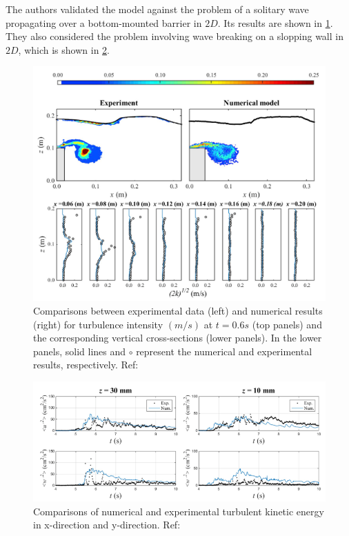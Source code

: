 The authors validated the model against the problem of a solitary wave propagating over a bottom-mounted barrier in $2D$. Its results are shown in \ref{fig:Wang2020-wave-propogation-result}. They also considered the problem involving wave breaking on a slopping wall in $2D$, which is shown in \ref{fig:Wang2020-wave-breaking-result}.
\begin{figure}[h!]
	\centering
	\includegraphics[scale=0.75]{Figures/research_papers/Wang2020-wave-propogation-result.png}
	\caption{Comparisons between experimental data (left) and numerical results (right) for turbulence intensity $(m/s)$ at $t=0.6s$ (top panels) and the corresponding vertical cross-sections (lower panels). In the lower panels, solid lines and $\circ$ represent the numerical and experimental results, respectively. Ref: \parencite{Wang2020}}
	\label{fig:Wang2020-wave-propogation-result}
\end{figure}
\begin{figure}[h!]
	\centering
	\includegraphics[scale=0.8]{Figures/research_papers/Wang2020-wave-breaking-result.png}
	\caption{Comparisons of numerical and experimental turbulent kinetic energy in x-direction and y-direction. Ref: \parencite{Wang2020}}
	\label{fig:Wang2020-wave-breaking-result}
\end{figure}

